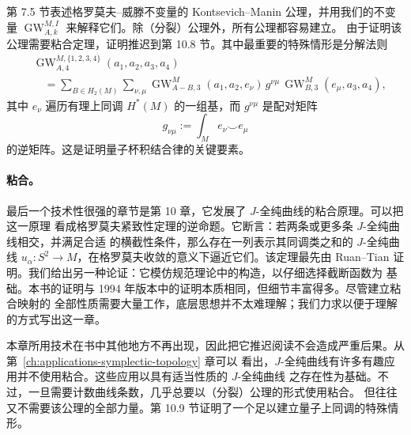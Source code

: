 第 7.5 节表述格罗莫夫--威滕不变量的 Kontsevich--Manin 公理，并用我们的不变量
$\operatorname{GW}_{A,k}^{M,I}$ 来解释它们。除（分裂）公理外，所有公理都容易建立。
由于证明该公理需要粘合定理，证明推迟到第 10.8 节。其中最重要的特殊情形是分解法则
\begin{align*}
  &\operatorname{GW}_{A,4}^{M,\{1,2,3,4\}}(a_1,a_2,a_3,a_4)\\
  &\quad=
  \sum_{B\in H_2(M)}\sum_{\nu,\mu}
  \operatorname{GW}_{A-B,3}^M(a_1,a_2,e_\nu)\,
  g^{\nu\mu}\,
  \operatorname{GW}_{B,3}^M(e_\mu,a_3,a_4),
\end{align*}
其中 $e_\nu$ 遍历有理上同调 $H^*(M)$ 的一组基，而 $g^{\nu\mu}$ 是配对矩阵
\[
  g_{\nu\mu}:=\int_M e_\nu\smile e_\mu
\]
的逆矩阵。这是证明量子杯积结合律的关键要素。

\paragraph{粘合。}
最后一个技术性很强的章节是第 10 章，它发展了 $J$-全纯曲线的粘合原理。可以把这一原理
看成格罗莫夫紧致性定理的逆命题。它断言：若两条或更多条 $J$-全纯曲线相交，并满足合适
的横截性条件，那么存在一列表示其同调类之和的 $J$-全纯曲线
$u_\alpha:S^2\to M$，在格罗莫夫收敛的意义下逼近它们。该定理最先由 Ruan--Tian
 证明。我们给出另一种论证：它模仿规范理论中的构造，以仔细选择截断函数为
基础。本书的证明与 1994 年版本中的证明本质相同，但细节丰富得多。尽管建立粘合映射的
全部性质需要大量工作，底层思想并不太难理解；我们力求以便于理解的方式写出这一章。

本章所用技术在书中其他地方不再出现，因此把它推迟阅读不会造成严重后果。从第~\ref{ch:applications-symplectic-topology} 章可以
看出，$J$-全纯曲线有许多有趣应用并不使用粘合。这些应用以具有适当性质的 $J$-全纯曲线
之存在性为基础。不过，一旦需要计数曲线条数，几乎总要以（分裂）公理的形式使用粘合。
但往往又不需要该公理的全部力量。第 10.9 节证明了一个足以建立量子上同调的特殊情形。

